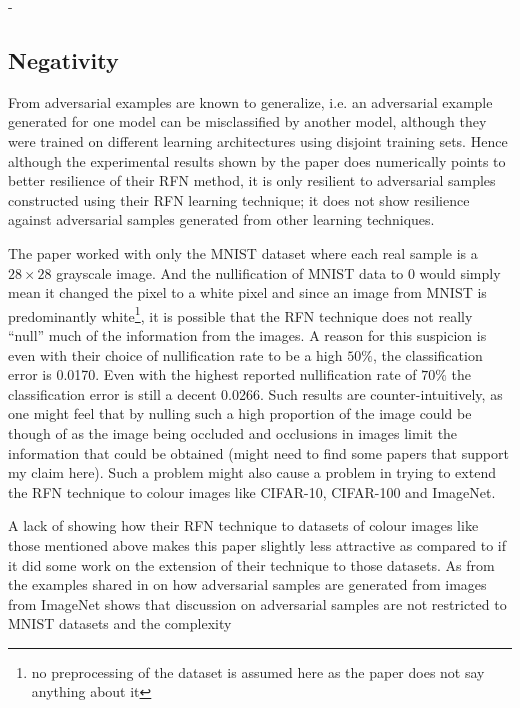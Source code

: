 \documentclass[a4paper,10pt]{article}
\theoremstyle{definition}
\begin{document}
- 


\subsection*{Negativity}




From \cite{goodfellow2014explaining} adversarial examples are known to generalize, i.e. an adversarial example generated for one model can be misclassified by another model, although they were trained on different learning architectures using disjoint training sets. Hence although the experimental results shown by the paper does numerically points to better resilience of their RFN method, it is only resilient to adversarial samples constructed using their RFN learning technique; it does not show resilience against adversarial samples generated from other learning techniques. 


The paper worked with only the MNIST dataset where each real sample is a $28 \times  28$ grayscale image. And the nullification of MNIST data to 0 would simply mean it changed the pixel to a white pixel and since an image from MNIST is predominantly white\footnote{no preprocessing of the dataset is assumed here as the paper does not say anything about it}, it is possible that the RFN technique does not really ``null'' much of the information from the images. A reason for this suspicion is even with their choice of nullification rate to be a high $50\%$, the classification error is 0.0170. Even with the highest reported nullification rate of $70\%$ the classification error is still  a decent 0.0266. Such results are counter-intuitively, as one might feel that by nulling such a high proportion of the image could be though of as the image being occluded and occlusions in images limit the information that could be obtained (might need to find some papers that support my claim here). Such a problem might also cause a problem in trying to extend the RFN technique to colour images like CIFAR-10, CIFAR-100 and ImageNet.

A lack of showing how their RFN technique to datasets of colour images like those mentioned above makes this paper slightly less attractive as compared to if it did some work on the extension of their technique to those datasets. As from the examples shared in \cite{szegedy2013intriguing} on how adversarial samples are generated from images from ImageNet shows that discussion on adversarial samples are not restricted to MNIST datasets and the complexity 
\end{document}
